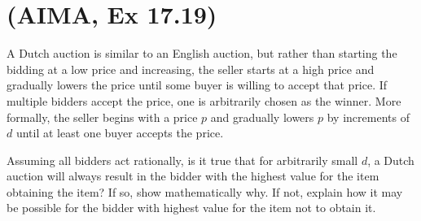 \documentclass[11pt, a4paper]{article}
\begin{document}
\begin{enumerate}

\end{enumerate}

\newpage

\section{(AIMA, Ex 17.19)}

A Dutch auction is similar to an English auction, but rather than starting the bidding at a low price and increasing, the seller starts at a high price and gradually lowers the price until some buyer is willing to accept that price. If multiple bidders accept the price, one is arbitrarily chosen as the winner. More formally, the seller begins with a price $p$ and gradually lowers $p$ by increments of $d$ until at least one buyer accepts the price.

Assuming all bidders act rationally, is it true that for arbitrarily small $d$, a Dutch auction will always result in the bidder with the highest value for the item obtaining the item? If so, show mathematically why. If not, explain how it may be possible for the bidder with highest value for the item not to obtain it.
\end{document}
